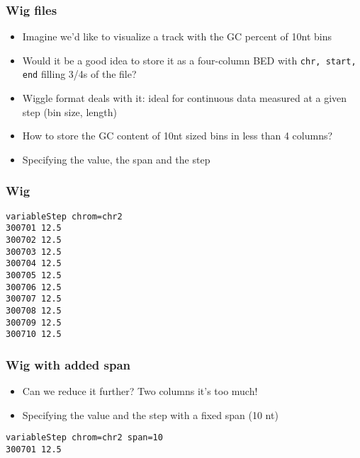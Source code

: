 \documentclass{beamer}
\begin{document}




\begin{frame}
  \frametitle{Wig files}
  \begin{itemize}
  \item Imagine we'd like to visualize a track with the GC percent of 10nt bins
  \item Would it be a good idea to store it as a four-column BED with \texttt{chr, start, end} filling 3/4s of the file?
  \item Wiggle format deals with it: ideal for continuous data measured at a given step (bin size, length)
  \end{itemize}
\end{frame}


\begin{frame}[fragile]

  \begin{itemize}
  \item How to store the GC content of 10nt sized bins in less than 4 columns?
  \item Specifying the value, the span and the step
  \end{itemize}

  \frametitle{Wig}
\begin{verbatim}
variableStep chrom=chr2
300701 12.5
300702 12.5
300703 12.5
300704 12.5
300705 12.5
300706 12.5
300707 12.5
300708 12.5
300709 12.5
300710 12.5
\end{verbatim}
\end{frame}


\begin{frame}[fragile]
  \frametitle{Wig with added span}

  \begin{itemize}
  \item Can we reduce it further? Two columns it's too much! 
  \item Specifying the value and the step with a fixed span (10 nt)
  \end{itemize}

\begin{verbatim}
variableStep chrom=chr2 span=10
300701 12.5
\end{verbatim}
\end{frame}
\end{document}
